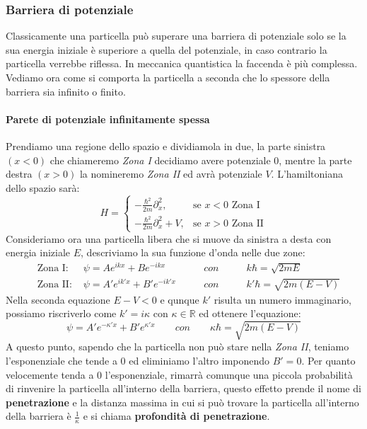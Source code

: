 \subsubsection{Barriera di potenziale}
Classicamente una particella può superare una barriera di potenziale solo se la sua energia iniziale è superiore a quella del potenziale, in caso contrario la particella verrebbe riflessa. In meccanica quantistica la faccenda è più complessa. Vediamo ora come si comporta la particella a seconda che lo spessore della barriera sia infinito o finito.

\paragraph{Parete di potenziale infinitamente spessa}
Prendiamo una regione dello spazio e dividiamola in due, la parte sinistra $(x < 0)$ che chiameremo \textit{Zona I} decidiamo avere potenziale $0$, mentre la parte destra $(x > 0)$ la nomineremo \textit{Zona II} ed avrà potenziale $V$. L'hamiltoniana dello spazio sarà:
$$H=\begin{cases} - \frac{\hbar^2}{2m} \partial_x^2, & \mbox{se } x<0 \mbox{ Zona I} \\ - \frac{\hbar^2}{2m} \partial_x^2 + V, & \mbox{se } x>0 \mbox{ Zona II}
\end{cases}$$
Consideriamo ora una particella libera che si muove da sinistra a desta con energia iniziale $E$, descriviamo la sua funzione d'onda nelle due zone:
\begin{equation}
\begin{aligned}
  \quad \mbox{Zona I: }  &\psi = Ae^{ikx} + Be^{-ikx} \qquad & con \qquad & k\hbar = \sqrt{2mE}\\
  \quad \mbox{Zona II: } &\psi = A'e^{ik'x} + B'e^{-ik'x} \qquad & con \qquad & k'\hbar = \sqrt{2m(E-V)}
\end{aligned}
\end{equation}
Nella seconda equazione $E - V < 0$ e qunque $k'$ risulta un numero immaginario, possiamo riscriverlo come $k' = i \kappa$ con $\kappa \in \mathbb{R}$ ed ottenere l'equazione:
$$\psi = A'e^{-\kappa'x} + B'e^{\kappa'x} \qquad  con \qquad \kappa\hbar = \sqrt{2m(E-V)}$$
A questo punto, sapendo che la particella non può stare nella \textit{Zona II}, teniamo l'esponenziale che tende a $0$ ed eliminiamo l'altro imponendo $B' = 0$. Per quanto velocemente tenda a $0$ l'esponenziale, rimarrà comunque una piccola probabilità di rinvenire la particella all'interno della barriera, questo effetto prende il nome di \textbf{penetrazione} e la distanza massima in cui si può trovare la particella all'interno della barriera è $\frac{1}{\kappa}$ e si chiama \textbf{profondità di penetrazione}.

